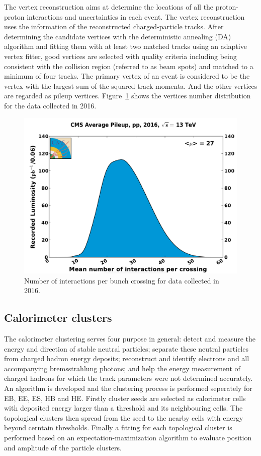 \vspace{0.3cm}
The vertex reconstruction aims at determine the locations of all the proton-proton interactions and uncertainties in each event. The vertex reconstruction uses the information of the reconstructed charged-particle tracks. After determining the candidate vertices with the deterministic annealing (DA) algorithm and fitting them with at least two matched tracks using an adaptive vertex fitter, good vertices are selected with quality criteria including being consistent with the collision region (referred to as beam spots) and matched to a minimum of four tracks. The primary vertex of an event is considered to be the vertex with the largest sum of the squared track momenta. And the other vertices are regarded as pileup vertices. Figure~\ref{fig:ob_Nvertex} shows the vertices number distribution for the data collected in 2016.
\begin{figure}[htbp]
\begin{center}
\includegraphics[width=0.72\linewidth]{figures/ob_Nvertex.png}
\caption{Number of interactions per bunch crossing for data collected in 2016.}
\label{fig:ob_Nvertex}
\end{center}
\end{figure}

\subsection{Calorimeter clusters}
The calorimeter clustering serves four purpose in general: detect and measure the energy and direction of stable neutral particles; separate these neutral particles from charged hadron energy deposits; reconstruct and identify electrons and all accompanying bremsstrahlung photons; and help the energy measurement of charged hadrons for which the track parameters were not determined accurately. An algorithm is developed and the clustering process is performed seperately for EB, EE, ES, HB and HE. Firstly cluster seeds are selected as calorimeter cells with deposited energy larger than a threshold and its neighbouring cells. The topological clusters then spread from the seed to the nearby cells with energy beyond cerntain thresholds. Finally a fitting for each topological cluster is performed based on an expectation-maximization algorithm to evaluate position and amplitude of the particle clusters.


